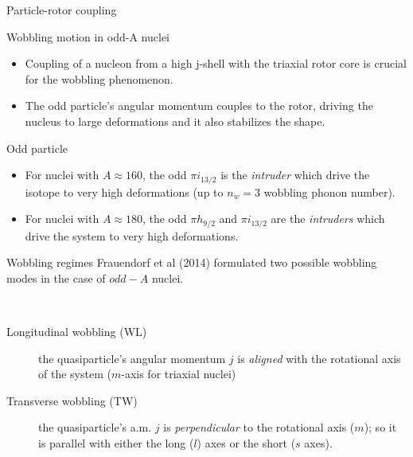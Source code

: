\documentclass{beamer}
\begin{document}
\begin{frame}{Particle-rotor coupling}
  \begin{block}{Wobbling motion in odd-A nuclei}  
    \begin{itemize}
      \item Coupling of a nucleon from a high j-shell with the triaxial rotor core is crucial for the wobbling phenomenon.
      \item The odd particle’s angular momentum couples to the rotor, driving the nucleus to large deformations and it also stabilizes the shape.
    \end{itemize}
  \end{block}
  \begin{exampleblock}{Odd particle}
  \begin{itemize}
      \item For nuclei with $A\approx160$, the odd $\pi i_{13/2}$ is the \emph{intruder} which drive the isotope to very high deformations (up to $n_w=3$ wobbling phonon number).
      \item For nuclei with $A\approx180$, the odd $\pi h_{9/2}$ and $\pi i_{13/2}$ are the \emph{intruders} which drive the system to very high deformations.
  \end{itemize}
  \end{exampleblock}
\end{frame}


\begin{frame}{Wobbling regimes}
  Frauendorf et al (2014) formulated two possible wobbling modes in the case of $odd-A$ nuclei.
  \begin{block}{$\ $}
    \begin{description}
      \item[Longitudinal wobbling (WL)] the quasiparticle's angular momentum $j$ is \emph{aligned} with the rotational axis of the system ($m$-axis for triaxial nuclei)
      \item[Transverse wobbling (TW)] the quasiparticle's a.m. $j$ is \emph{perpendicular} to the rotational axis ($m$); so it is parallel with either the long ($l$) axes or the short ($s$ axes). 
    \end{description}
  \end{block}
\end{frame}
\end{document}
